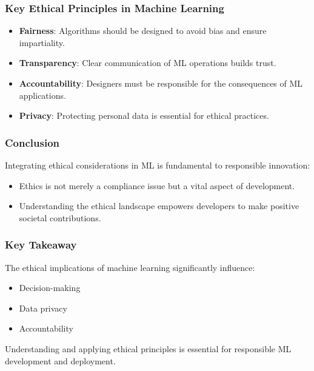 \documentclass[aspectratio=169]{beamer}
\begin{document}
\begin{frame}[fragile]
    \frametitle{Key Ethical Principles in Machine Learning}
    \begin{itemize}
        \item \textbf{Fairness}: Algorithms should be designed to avoid bias and ensure impartiality.
        \item \textbf{Transparency}: Clear communication of ML operations builds trust.
        \item \textbf{Accountability}: Designers must be responsible for the consequences of ML applications.
        \item \textbf{Privacy}: Protecting personal data is essential for ethical practices.
    \end{itemize}
\end{frame}

\begin{frame}[fragile]
    \frametitle{Conclusion}
    Integrating ethical considerations in ML is fundamental to responsible innovation:
    \begin{itemize}
        \item Ethics is not merely a compliance issue but a vital aspect of development.
        \item Understanding the ethical landscape empowers developers to make positive societal contributions.
    \end{itemize}
\end{frame}

\begin{frame}[fragile]
    \frametitle{Key Takeaway}
    The ethical implications of machine learning significantly influence:
    \begin{itemize}
        \item Decision-making
        \item Data privacy
        \item Accountability
    \end{itemize}
    Understanding and applying ethical principles is essential for responsible ML development and deployment.
\end{frame}
\end{document}
